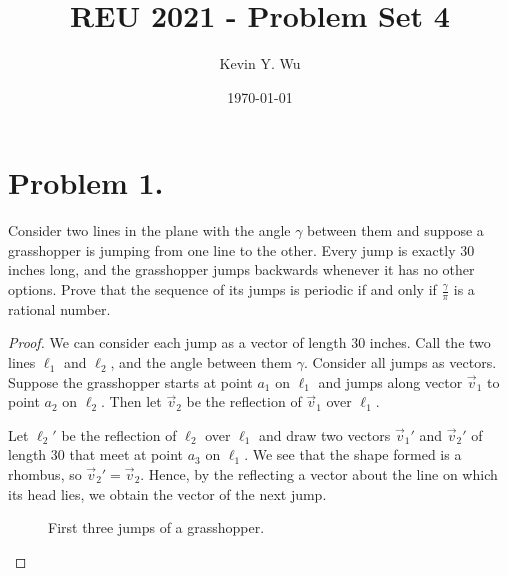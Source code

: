 \documentclass{article}
\title{REU 2021 - Problem Set 4}
\author{Kevin Y. Wu}
\date{\today}
\begin{document}
\maketitle

\tableofcontents
\newpage
{}


\section{Problem 1.}
Consider two lines in the plane with the angle $\gamma$ between them and suppose a grasshopper is jumping from one line to the other. Every jump is exactly $30$ inches long, and the grasshopper jumps backwards whenever it has no other options. Prove that the sequence of its jumps is periodic if and only if $\frac{\gamma}{\pi}$ is a rational number.
\begin{proof}
We can consider each jump as a vector of length $30$ inches. Call the two lines $\ell_1$ and $\ell_2$, and the angle between them $\gamma$. Consider all jumps as vectors. Suppose the grasshopper starts at point $a_1$ on $\ell_1$ and jumps along vector $\overrightarrow{v}_1$ to point $a_2$ on $\ell_2$. Then let $\overrightarrow{v}_2$ be the reflection of $\overrightarrow{v}_1$ over $\ell_1$. 
\par Let $\ell_2'$ be the reflection of $\ell_2$ over $\ell_1$ and draw two vectors $\overrightarrow{v}_1'$ and $\overrightarrow{v}_2'$ of length $30$ that meet at point $a_3$ on $\ell_1$. We see that the shape formed is a rhombus, so $\overrightarrow{v}_2'=\overrightarrow{v}_2$. Hence, by the reflecting a vector about the line on which its head lies, we obtain the vector of the next jump.

\begin{figure}[h]
    \centering
    
    \caption{First three jumps of a grasshopper.}
\end{figure}


\end{proof}
\end{document}
